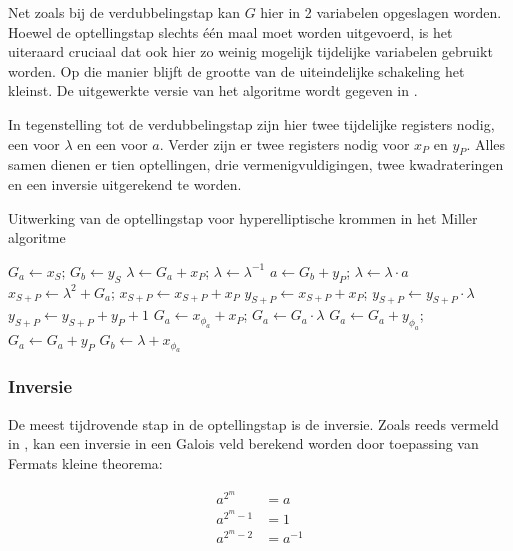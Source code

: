 Net zoals bij de verdubbelingstap kan $G$ hier in 2 variabelen opgeslagen worden. Hoewel de optellingstap slechts \'e\'en maal moet worden uitgevoerd, is het uiteraard cruciaal dat ook hier zo weinig mogelijk tijdelijke variabelen gebruikt worden. Op die manier blijft de grootte van de uiteindelijke schakeling het kleinst. De uitgewerkte versie van het algoritme wordt gegeven in .

In tegenstelling tot de verdubbelingstap zijn hier twee tijdelijke registers nodig, een voor $\lambda$ en een voor $a$. Verder zijn er twee registers nodig voor $x_P$ en $y_P$. Alles samen dienen er tien optellingen, drie vermenigvuldigingen, twee kwadrateringen en een inversie uitgerekend te worden.

\begin{algorithm}[h]
	\caption{Uitwerking van de optellingstap voor hyperelliptische krommen in het Miller algoritme}
	\label{algoritme-implementatie-miller-add-detail}
	$G_a \leftarrow x_S$; $G_b \leftarrow y_S$\;
	$\lambda \leftarrow G_a + x_P$; $\lambda \leftarrow \lambda^{-1}$\;
	$a \leftarrow G_b + y_P$; $\lambda \leftarrow \lambda \cdot a$\;
	$x_{S + P} \leftarrow \lambda ^2 + G_a$; $x_{S + P} \leftarrow x_{S + P} + x_P$\;
	$y_{S + P} \leftarrow x_{S + P} + x_P$; $y_{S + P} \leftarrow y_{S + P} \cdot \lambda$\;
	$y_{S + P} \leftarrow y_{S + P} + y_P + 1$\;
	$G_a \leftarrow x_{\phi_a} + x_P$; $G_a \leftarrow G_a \cdot \lambda$\;
	$G_a \leftarrow G_a + y_{\phi_a}$; $G_a \leftarrow G_a + y_P$\;
	$G_b \leftarrow \lambda + x_{\phi_a}$\;
\end{algorithm}

\subsubsection{Inversie}

De meest tijdrovende stap in de optellingstap is de inversie.  Zoals reeds vermeld in , kan een inversie in een Galois veld berekend worden door toepassing van Fermats kleine theorema:

\[\begin{aligned}
a^{2^m}		&= a\\
a^{2^m - 1}	&= 1\\
a^{2^m - 2}	&= a^{-1}\\
\end{aligned}\]

